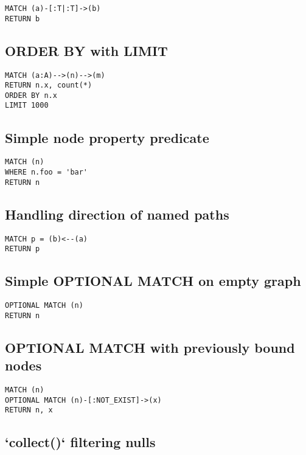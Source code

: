 \begin{lstlisting}
MATCH (a)-[:T|:T]->(b)
RETURN b
\end{lstlisting}

\subsection{ORDER BY with LIMIT}

\begin{lstlisting}
MATCH (a:A)-->(n)-->(m)
RETURN n.x, count(*)
ORDER BY n.x
LIMIT 1000
\end{lstlisting}

\subsection{Simple node property predicate}

\begin{lstlisting}
MATCH (n)
WHERE n.foo = 'bar'
RETURN n
\end{lstlisting}

\subsection{Handling direction of named paths}

\begin{lstlisting}
MATCH p = (b)<--(a)
RETURN p
\end{lstlisting}

\subsection{Simple OPTIONAL MATCH on empty graph}

\begin{lstlisting}
OPTIONAL MATCH (n)
RETURN n
\end{lstlisting}

\subsection{OPTIONAL MATCH with previously bound nodes}

\begin{lstlisting}
MATCH (n)
OPTIONAL MATCH (n)-[:NOT_EXIST]->(x)
RETURN n, x
\end{lstlisting}

\subsection{`collect()` filtering nulls}

